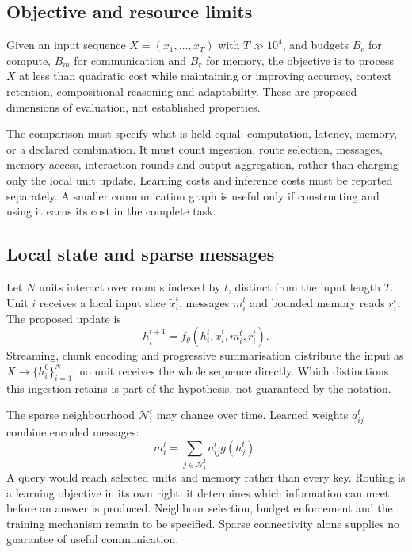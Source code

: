 \subsection{Objective and resource limits}

Given an input sequence $X=(x_1,\ldots,x_T)$ with $T\gg10^4$, and budgets $B_c$ for compute, $B_m$ for communication and $B_r$ for memory, the objective is to process $X$ at less than quadratic cost while maintaining or improving accuracy, context retention, compositional reasoning and adaptability. These are proposed dimensions of evaluation, not established properties.

The comparison must specify what is held equal: computation, latency, memory, or a declared combination. It must count ingestion, route selection, messages, memory access, interaction rounds and output aggregation, rather than charging only the local unit update. Learning costs and inference costs must be reported separately. A smaller communication graph is useful only if constructing and using it earns its cost in the complete task.

\subsection{Local state and sparse messages}

Let $N$ units interact over rounds indexed by $t$, distinct from the input length $T$. Unit $i$ receives a local input slice $\tilde{x}_i^t$, messages $m_i^t$ and bounded memory reads $r_i^t$. The proposed update is
\begin{equation}
 h_i^{t+1}=f_\theta(h_i^t,\tilde{x}_i^t,m_i^t,r_i^t).
\end{equation}
Streaming, chunk encoding and progressive summarisation distribute the input as $X\to\{h_i^0\}_{i=1}^N$; no unit receives the whole sequence directly. Which distinctions this ingestion retains is part of the hypothesis, not guaranteed by the notation.

The sparse neighbourhood $\mathcal{N}_i^t$ may change over time. Learned weights $a_{ij}^t$ combine encoded messages:
\begin{equation}
 m_i^t=\sum_{j\in\mathcal{N}_i^t}a_{ij}^t g(h_j^t).
\end{equation}
A query would reach selected units and memory rather than every key. Routing is a learning objective in its own right: it determines which information can meet before an answer is produced. Neighbour selection, budget enforcement and the training mechanism remain to be specified. Sparse connectivity alone supplies no guarantee of useful communication.

